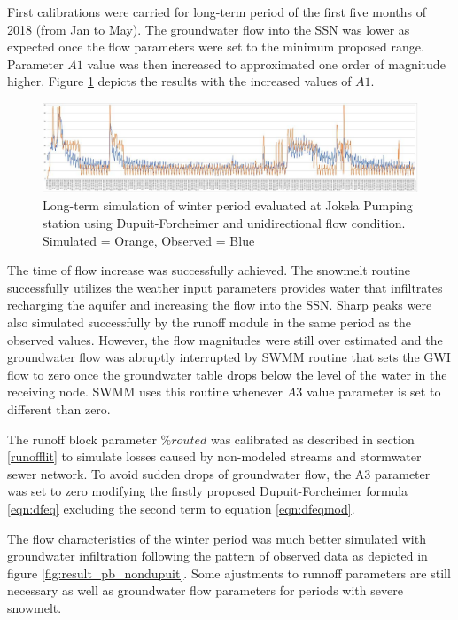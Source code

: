 First calibrations were carried for long-term period of the first five months of 2018 (from Jan to May). The groundwater flow into the \ac{SSN} was lower as expected once the flow parameters were set to the minimum proposed range. Parameter $A1$ value was then increased to approximated one order of magnitude higher. Figure \ref{fig:result_pb_dupuit} depicts the results with the increased values of $A1$. 


\begin{figure}[h]
    \centering
	\includegraphics[scale=0.65]{figures/result_pb_depuit_forcheimer.JPG}
	\caption{Long-term simulation of winter period evaluated at Jokela Pumping station using Dupuit-Forcheimer and unidirectional flow condition. Simulated = Orange, Observed = Blue}
	\label{fig:result_pb_dupuit}
\end{figure}



The time of flow increase was successfully achieved. The snowmelt routine successfully utilizes the weather input parameters provides water that infiltrates recharging the aquifer and increasing the flow into the \ac{SSN}. Sharp peaks were also simulated successfully by the runoff module in the same period as the observed values. However, the flow magnitudes were still over estimated and the groundwater flow was abruptly interrupted by SWMM routine that sets the GWI flow to zero once the groundwater table drops below the level of the water in the receiving node. SWMM uses this routine whenever $A3$ value parameter is set to different than zero.

The runoff block parameter $\%routed$ was calibrated as described in section \ref{runofflit} to simulate losses caused by non-modeled streams and stormwater sewer network. To avoid sudden drops of groundwater flow, the A3 parameter was set to zero modifying the firstly proposed Dupuit-Forcheimer formula \ref{eqn:dfeq} excluding the second term to equation \ref{eqn:dfeqmod}.

The flow characteristics of the winter period was much better simulated with groundwater infiltration following the pattern of observed data as depicted in figure \ref{fig:result_pb_nondupuit}. Some ajustments to runnoff parameters are still necessary as well as groundwater flow parameters for periods with severe snowmelt.

